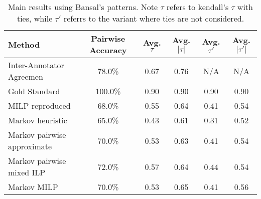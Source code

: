 \begin{table}
\small
\centering
\begin{tabular}{|l|c|c|c|c|c|}
% 
\hline 
\bf Method & \bf Pairwise Accuracy & \bf Avg. $\tau$ & \bf Avg. $|\tau|$ & \bf Avg. $\tau'$ & \bf Avg. $|\tau'|$ \\ 
\hline
% 
Inter-Annotator Agreemen        & 78.0\% & 0.67 & 0.76 & N/A & N/A       \\
Gold Standard                   & 100.0\% & 0.90 & 0.90 & 0.90 & 0.90    \\
\hline
% 
MILP reproduced                 & 68.0\% & 0.55 & 0.64 & 0.41 & 0.54      \\
\hline
% 
Markov heuristic                & 65.0\% & 0.43 & 0.61 & 0.31 & 0.52  \\
Markov pairwise approximate     & 70.0\% & 0.53 & 0.63 & 0.41 & 0.54  \\
Markov pairwise mixed ILP       & 72.0\% & 0.57 & 0.64 & 0.44 & 0.54  \\
Markov MILP                     & 70.0\% & 0.53 & 0.65 & 0.41 & 0.56  \\
% 
\hline
\end{tabular}
\caption{\label{font-table} Main results using Bansal's patterns. Note $\tau$ refers to kendall's $\tau$ with ties, while $\tau'$ referrs to the variant where ties are not considered.}
\end{table}\newpage



































